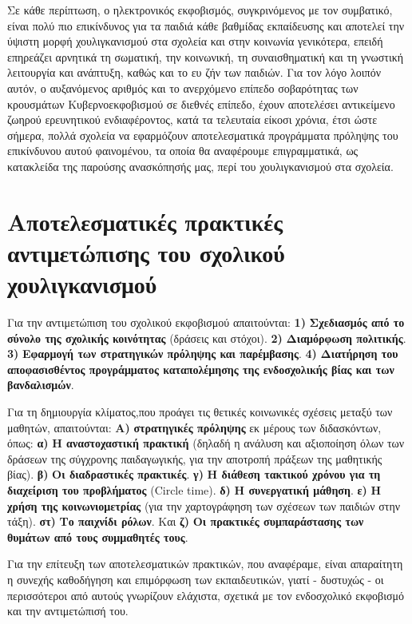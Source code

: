 \documentclass[12pt,a4paper,oneside]{book}
\begin{document}
\indent Σε κάθε περίπτωση, ο ηλεκτρονικός εκφοβισμός, συγκρινόμενος με τον
συμβατικό, είναι πολύ πιο επικίνδυνος για τα παιδιά κάθε βαθμίδας εκπαίδευσης και αποτελεί την ύψιστη μορφή χουλιγκανισμού
στα σχολεία και στην κοινωνία γενικότερα, επειδή επηρεάζει αρνητικά τη σωματική,
την κοινωνική, τη συναισθηματική και τη γνωστική λειτουργία και ανάπτυξη, καθώς
και το ευ ζήν των παιδιών. Για τον λόγο λοιπόν αυτόν, ο αυξανόμενος αριθμός και
το ανερχόμενο επίπεδο σοβαρότητας των κρουσμάτων Kυβερνοεκφοβισμού σε διεθνές
επίπεδο, έχουν αποτελέσει αντικείμενο ζωηρού ερευνητικού ενδιαφέροντος, κατά τα
τελευταία είκοσι χρόνια, έτσι ώστε σήμερα, πολλά σχολεία να εφαρμόζουν
αποτελεσματικά προγράμματα πρόληψης του επικίνδυνου αυτού φαινομένου, τα οποία
θα αναφέρουμε επιγραμματικά, ως κατακλείδα της παρούσης ανασκόπησής μας, περί
του χουλιγκανισμού στα σχολεία.
\section*{Αποτελεσματικές πρακτικές αντιμετώπισης του σχολικού χουλιγκανισμού}
\indent Για την αντιμετώπιση του σχολικού εκφοβισμού απαιτούνται: \textbf{1)}
\textbf{Σχεδιασμός από το σύνολο της σχολικής κοινότητας} (δράσεις και στόχοι). \textbf{2)} \textbf{Διαμόρφωση
πολιτικής}. \textbf{3)} \textbf{Εφαρμογή των στρατηγικών πρόληψης και
παρέμβασης}. \textbf{4)} \textbf{Διατήρηση του αποφασισθέντος προγράμματος
καταπολέμησης της ενδοσχολικής βίας και των βανδαλισμών}.

\indent Για τη δημιουργία κλίματος,που προάγει τις θετικές κοινωνικές σχέσεις μεταξύ των μαθητών, απαιτούνται:
\textbf{A)} \textbf{στρατηγικές πρόληψης} εκ μέρους των διδασκόντων, όπως:
\textbf{α)} \textbf{Η αναστοχαστική πρακτική}  (δηλαδή η ανάλυση και αξιοποίηση
όλων των δράσεων της σύγχρονης παιδαγωγικής, για την αποτροπή πράξεων της μαθητικής
βίας). \textbf{β)} \textbf{Οι διαδραστικές πρακτικές}. \textbf{γ)} \textbf{Η
διάθεση τακτικού χρόνου για τη διαχείριση του προβλήματος} (Circle time).
\textbf{δ)} \textbf{Η συνεργατική μάθηση}. \textbf{ε)} \textbf{Η χρήση της
κοινωνιομετρίας} (για την χαρτογράφηση των σχέσεων των παιδιών στην τάξη).
\textbf{στ)} \textbf{Το παιχνίδι ρόλων}. Και \textbf{ζ)} \textbf{Οι πρακτικές
συμπαράστασης των θυμάτων από τους συμμαθητές τους}.

\indent Για την επίτευξη των αποτελεσματικών πρακτικών, που αναφέραμε, είναι
απαραίτητη η συνεχής καθοδήγηση και επιμόρφωση των εκπαιδευτικών, γιατί - δυστυχώς - οι περισσότεροι από αυτούς
γνωρίζουν ελάχιστα, σχετικά με τον ενδοσχολικό εκφοβισμό και την αντιμετώπισή
του.
\end{document}
